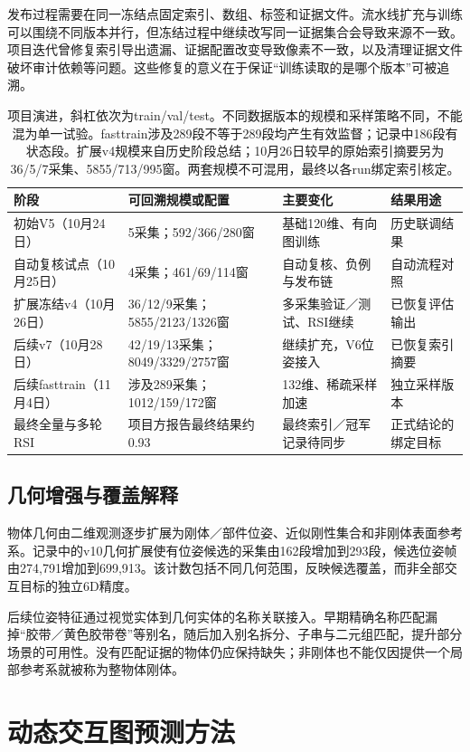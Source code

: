 \documentclass[10pt,twocolumn,letterpaper]{article}
\begin{document}
发布过程需要在同一冻结点固定索引、数组、标签和证据文件。流水线扩充与训练可以围绕不同版本并行，但冻结过程中继续改写同一证据集合会导致来源不一致。项目迭代曾修复索引导出遗漏、证据配置改变导致像素不一致，以及清理证据文件破坏审计依赖等问题。这些修复的意义在于保证“训练读取的是哪个版本”可被追溯。

\begin{table}[t]
\centering\small\setlength{\tabcolsep}{5pt}
\begin{tabular}{llll}
\toprule 阶段 & 可回溯规模或配置 & 主要变化 & 结果用途\\\midrule
初始V5（10月24日） & 5采集；592/366/280窗 & 基础120维、有向图训练 & 历史联调结果\\
自动复核试点（10月25日） & 4采集；461/69/114窗 & 自动复核、负例与发布链 & 自动流程对照\\
扩展冻结v4（10月26日） & 36/12/9采集；5855/2123/1326窗 & 多采集验证／测试、RSI继续 & 已恢复评估输出\\
后续v7（10月28日） & 42/19/13采集；8049/3329/2757窗 & 继续扩充，V6位姿接入 & 已恢复索引摘要\\
后续fasttrain（11月4日） & 涉及289采集；1012/159/172窗 & 132维、稀疏采样加速 & 独立采样版本\\
最终全量与多轮RSI & 项目方报告最终结果约0.93 & 最终索引／冠军记录待同步 & 正式结论的绑定目标\\
\bottomrule
\end{tabular}
\caption{项目演进，斜杠依次为train/val/test。不同数据版本的规模和采样策略不同，不能混为单一试验。fasttrain涉及289段不等于289段均产生有效监督；记录中186段有状态段。扩展v4规模来自历史阶段总结；10月26日较早的原始索引摘要另为36/5/7采集、5855/713/995窗。两套规模不可混用，最终以各run绑定索引核定。}
\label{tab:versions}
\end{table}

\subsection{几何增强与覆盖解释}
物体几何由二维观测逐步扩展为刚体／部件位姿、近似刚性集合和非刚体表面参考系。记录中的v10几何扩展使有位姿候选的采集由162段增加到293段，候选位姿帧由274,791增加到699,913。该计数包括不同几何范围，反映候选覆盖，而非全部交互目标的独立6D精度。

后续位姿特征通过视觉实体到几何实体的名称关联接入。早期精确名称匹配漏掉“胶带／黄色胶带卷”等别名，随后加入别名拆分、子串与二元组匹配，提升部分场景的可用性。没有匹配证据的物体仍应保持缺失；非刚体也不能仅因提供一个局部参考系就被称为整物体刚体。
\section{动态交互图预测方法}
\end{document}
